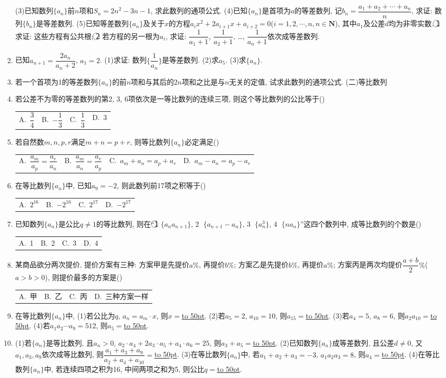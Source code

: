 \documentclass[10pt,a4paper]{article}
\newcommand{\blank}[1]{\underline{\hbox to #1pt{}}}
\newcommand{\fourch}[4]{\par\begin{tabular}{p{.23\textwidth}p{.23\textwidth}p{.23\textwidth}p{.23\textwidth}}
A.~#1 &B.~#2& C.~#3& D.~#4
\end{tabular}}
\begin{document}
\begin{enumerate}[1.]
(3)已知数列$\{a_n\}$前$n$项和$S_n=2n^2-3n-1$, 求此数列的通项公式.
(4)已知$\{a_n\}$是首项为$a$的等差数列, 记$b_n=\dfrac{a_1+a_2+\cdots +a_n}n$, 求证: 数列$\{b_n\}$是等差数列.
(5)已知等差数列$\{a_n\}$及关于$x$的方程$a_ix^2+2a_{i+1}x+a_{i+2}=0$($i=1,2,\cdots ,n,n\in \mathbf{N}$), 其中$a_1$及公差$d$均为非零实数.
\textcircled{1} 求证: 这些方程有公共根;
\textcircled{2} 若方程的另一根为$a_i$, 求证: $\dfrac 1{a_1+1}$, $\dfrac 1{a_2+1}$, …, $\dfrac 1{a_n+1}$依次成等差数列.
\item 已知$a_{n+1}=\dfrac{2{a_n}}{{a_n}+2}$, $a_1=2$.
(1)求证: 数列$\{\dfrac 1{a_n}\}$是等差数列.
(2)求$a_5$.
(3)求$\{a_n\}$.
\item 若一个首项为1的等差数列$\{a_n\}$的前$n$项和与其后的$2n$项和之比是与$n$无关的定值, 试求此数列的通项公式.
(二)等比数列
\item 若公差不为零的等差数列的第2, 3, 6项依次是一等比数列的连续三项, 则这个等比数列的公比等于()
\fourch{$\dfrac 34$}{$-\dfrac 13$}{$\dfrac 13$}{3}
\item 若自然数$m,n,p,r$满足$m+n=p+r$, 则等比数列$\{a_n\}$必定满足()
\fourch{$\dfrac{a_m}{a_p}=\dfrac{a_r}{a_n}$}{$\dfrac{a_m}{a_n}=\dfrac{a_r}{a_p}$}{$a_m+a_n=a_p+a_r$}{$a_m-a_n=a_p-a_r$}
\item 在等比数列$\{a_n\}$中, 已知$a_9=-2$, 则此数列前17项之积等于()
\fourch{$2^{16}$}{$-2^{16}$}{$2^{17}$}{$-2^{17}$}
\item 已知数列$\{a_n\}$是公比$q\ne 1$的等比数列, 则在``\textcircled{1} $\{a_na_{n+1}\}$, \textcircled{2} $\{a_{n+1}-a_n\}$, \textcircled{3} $\{a_n^3\}$, \textcircled{4} $\{na_n\}$''这四个数列中, 成等比数列的个数是()
\fourch{1}{2}{3}{4}
\item 某商品欲分两次提价, 提价方案有三种: 方案甲是先提价$a\%$, 再提价$b\%$; 方案乙是先提价$b\%$, 再提价$a\%$; 方案丙是两次均提价$\dfrac{a+b}2\%$($a>b>0$), 则提价最多的方案是()
\fourch{甲}{乙}{丙}{三种方案一样}
\item 在等比数列$\{a_n\}$中,
(1)若公比为$q$, $a_n=a_m\cdot x$, 则$x=$\blank{50}.
(2)若$a_5=2$, $a_{10}=10$, 则$a_{15}=$\blank{50}.
(3)若$a_4=5$, $a_8=6$, 则$a_2a_{10}=$\blank{50}.
(4)若$a_1a_2\cdots a_9=512$, 则$a_5=$\blank{50}.
\item (1)若$\{a_n\}$是等比数列, 且$a_n>0$, $a_2\cdot a_4+2a_3\cdot a_5+a_4\cdot a_6=25$, 则$a_3+a_5=$\blank{50}.
(2)已知数列$\{a_n\}$成等差数列, 且公差$d\ne 0$, 又$a_1,a_3,a_9$依次成等比数列, 则$\dfrac{{a_1}+{a_3}+{a_9}}{{a_2}+{a_4}+{a_{10}}}=$\blank{50}.
(3)在等比数列$\{a_n\}$中, 若$a_1+a_2+a_3=-3$, $a_1a_2a_3=8$, 则$a_4=$\blank{50}.
(4)在等比数列$\{a_n\}$中, 若连续四项之积为16, 中间两项之和为5, 则公比$q=$\blank{50}.

\end{enumerate}
\end{document}
